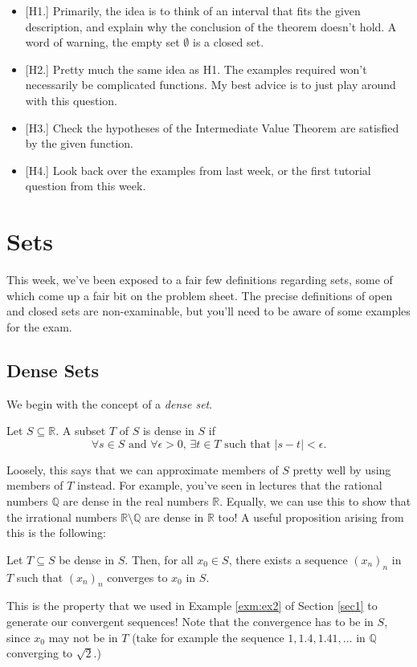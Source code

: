 \documentclass[
  12pt,
  a4paper]{extarticle}
\providecommand{\tightlist}{%
  \setlength{\itemsep}{0pt}\setlength{\parskip}{0pt}}
\theoremstyle{plain}
\theoremstyle{plain}
\theoremstyle{plain}
\theoremstyle{plain}
\theoremstyle{plain}
\theoremstyle{definition}
\theoremstyle{definition}
\theoremstyle{definition}
\theoremstyle{remark}
\let\BeginKnitrBlock\begin \let\EndKnitrBlock\end
\renewcommand{\;}{\,}
\begin{document}
\begin{itemize}
\tightlist
\item
  {[}H1.{]} Primarily, the idea is to think of an interval that fits the given description, and explain why the conclusion of the theorem doesn't hold. A word of warning, the empty set \(\emptyset\) is a closed set.
\item
  {[}H2.{]} Pretty much the same idea as H1. The examples required won't necessarily be complicated functions. My best advice is to just play around with this question.
\item
  {[}H3.{]} Check the hypotheses of the Intermediate Value Theorem are satisfied by the given function.
\item
  {[}H4.{]} Look back over the examples from last week, or the first tutorial question from this week.
\end{itemize}

\hypertarget{sets}{%
\section{Sets}\label{sets}}

This week, we've been exposed to a fair few definitions regarding sets, some of which come up a fair bit on the problem sheet. The precise definitions of open and closed sets are non-examinable, but you'll need to be aware of some examples for the exam.

\hypertarget{dense-sets}{%
\subsection{Dense Sets}\label{dense-sets}}

We begin with the concept of a \emph{dense set}.
\BeginKnitrBlock{definition}[Dense Set]
{\label{def:def3} }Let \(S \subseteq \mathbb{R}\). A subset \(T\) of \(S\) is dense in \(S\) if \[\forall s \in S \;\;\text{and}\;\; \forall \epsilon > 0,\; \exists t \in T \;\; \text{such that}\;\; \lvert s - t \rvert < \epsilon.\]
\EndKnitrBlock{definition}
Loosely, this says that we can approximate members of \(S\) pretty well by using members of \(T\) instead. For example, you've seen in lectures that the rational numbers \(\mathbb{Q}\) are dense in the real numbers \(\mathbb{R}\). Equally, we can use this to show that the irrational numbers \(\mathbb{R}\setminus\mathbb{Q}\) are dense in \(\mathbb{R}\) too! A useful proposition arising from this is the following:

\BeginKnitrBlock{proposition}
{\label{prp:prop1} }Let \(T \subseteq S\) be dense in \(S\). Then, for all \(x_0 \in S\), there exists a sequence \((x_n)_n\) in \(T\) such that \((x_n)_n\) converges to \(x_0\) in \(S\).
\EndKnitrBlock{proposition}
This is the property that we used in Example \ref{exm:ex2} of Section \ref{sec1} to generate our convergent sequences! Note that the convergence has to be in \(S\), since \(x_0\) may not be in \(T\) (take for example the sequence \(1, 1.4, 1.41,\ldots\) in \(\mathbb{Q}\) converging to \(\sqrt{2}\).)
\end{document}
